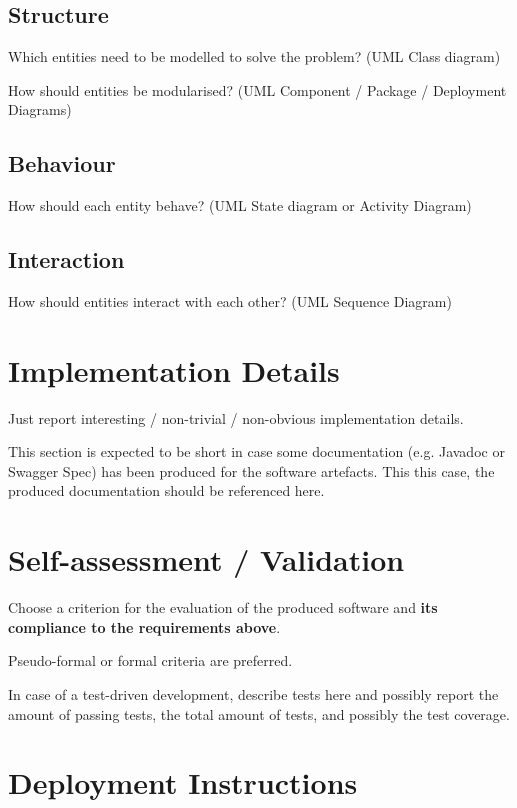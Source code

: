 \documentclass{scrartcl}
\begin{document}
    \subsection{Structure}

    Which entities need to be modelled to solve the problem?
%
    (UML Class diagram)

    How should entities be modularised?
%
    (UML Component / Package / Deployment Diagrams)

    \subsection{Behaviour}

    How should each entity behave?
%
    (UML State diagram or Activity Diagram)

    \subsection{Interaction}

    How should entities interact with each other?
%
    (UML Sequence Diagram)


    \section{Implementation Details}

    Just report interesting / non-trivial / non-obvious implementation details.

    This section is expected to be short in case some documentation (e.g. Javadoc or Swagger Spec) has been produced for the software artefacts.
%
    This this case, the produced documentation should be referenced here.


    \section{Self-assessment / Validation}

    Choose a criterion for the evaluation of the produced software and \textbf{its compliance to the requirements above}.

    Pseudo-formal or formal criteria are preferred.

    In case of a test-driven development, describe tests here and possibly report the amount of passing tests, the total amount of tests, and possibly the test coverage.


    \section{Deployment Instructions}
\end{document}
